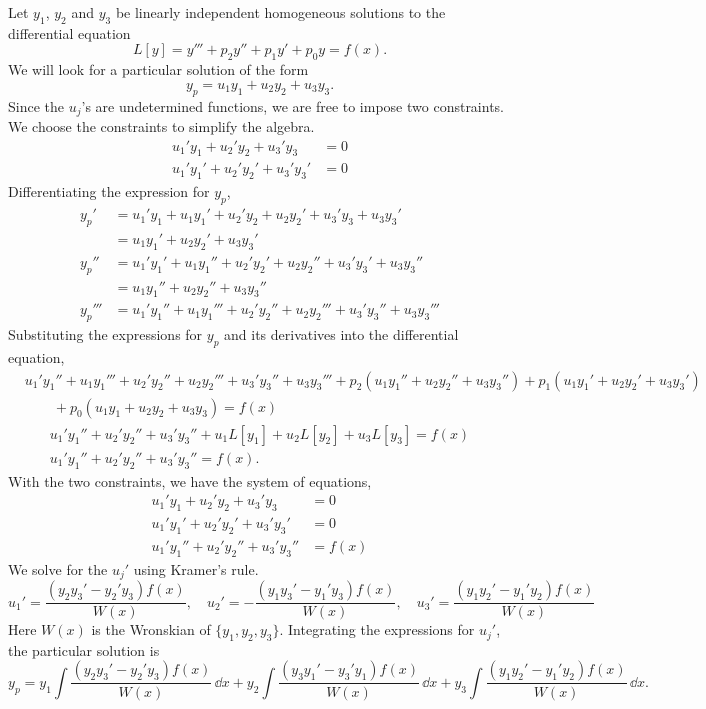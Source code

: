 {%
\begin{Solution}
  \label{solution y+p2y+p1y+p0y=f}
  Let $y_1$, $y_2$ and $y_3$ be linearly independent homogeneous solutions
  to the differential equation
  \[ L[y] = y''' + p_2 y'' + p_1 y' + p_0 y = f(x). \]
  We will look for a particular solution of the form
  \[ y_p = u_1 y_1 + u_2 y_2 + u_3 y_3. \]
  Since the $u_j$'s are undetermined functions, we are free to impose two
  constraints.  We choose the constraints to simplify the algebra.
  \begin{align*}
    u_1' y_1 + u_2' y_2 + u_3' y_3 &= 0 \\
    u_1' y_1'+ u_2' y_2'+ u_3' y_3'&= 0
  \end{align*}
  Differentiating the expression for $y_p$,
  \begin{align*}
    y_p'    &= u_1' y_1 + u_1 y_1' + u_2' y_2 + u_2 y_2' + u_3' y_3 + u_3 y_3' \\
    &= u_1 y_1' + u_2 y_2' + u_3 y_3' \\
    y_p''   &= u_1' y_1' + u_1 y_1'' + u_2' y_2' + u_2 y_2'' 
    + u_3' y_3' + u_3 y_3'' \\
    &= u_1 y_1'' + u_2 y_2'' + u_3 y_3'' \\
    y_p'''  &= u_1' y_1'' + u_1 y_1''' + u_2' y_2'' + u_2 y_2''' 
    + u_3' y_3'' + u_3 y_3''' 
  \end{align*}
  Substituting the expressions for $y_p$ and its derivatives into the 
  differential equation,
  \begin{align*}
    &u_1' y_1'' + u_1 y_1''' + u_2' y_2'' + u_2 y_2''' + u_3' y_3'' + u_3 y_3'''
    + p_2 (u_1 y_1'' + u_2 y_2'' + u_3 y_3'')
    + p_1 (u_1 y_1' + u_2 y_2' + u_3 y_3') \\
    &\qquad + p_0 (u_1 y_1 + u_2 y_2 + u_3 y_3) = f(x) 
  \end{align*}
  \begin{gather*}
    u_1' y_1'' + u_2' y_2'' + u_3' y_3'' + u_1 L[y_1] + u_2 L[y_2] + u_3 L[y_3]
    = f(x) \\
    u_1' y_1'' + u_2' y_2'' + u_3' y_3'' = f(x).
  \end{gather*}
  With the two constraints, we have the system of equations,
  \begin{align*}
    u_1' y_1 + u_2' y_2 + u_3' y_3 &= 0 \\
    u_1' y_1'+ u_2' y_2'+ u_3' y_3'&= 0 \\
    u_1' y_1'' + u_2' y_2'' + u_3' y_3'' &= f(x)
  \end{align*}
  We solve for the $u_j'$ using Kramer's rule.
  \[ u_1' = \frac{(y_2 y_3' - y_2' y_3)f(x)}{W(x)}, \quad
  u_2' = -\frac{(y_1 y_3' - y_1' y_3)f(x)}{W(x)}, \quad
  u_3' = \frac{(y_1 y_2' - y_1' y_2)f(x)}{W(x)} \]
  Here $W(x)$ is the Wronskian of $\{y_1, y_2, y_3\}$.  Integrating the 
  expressions for $u_j'$, the particular solution is
  \[ \boxed{ y_p = y_1 \int \frac{(y_2 y_3' - y_2' y_3) f(x)}{W(x)}\,\dd x
    + y_2 \int \frac{(y_3 y_1' - y_3' y_1) f(x)}{W(x)}\,\dd x
    + y_3 \int \frac{(y_1 y_2' - y_1' y_2) f(x)}{W(x)}\,\dd x. }\]
\end{Solution}


}
